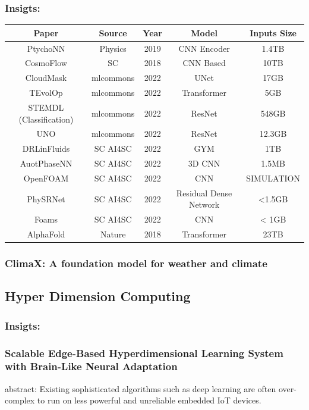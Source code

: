 \documentclass[UTF8]{article}
\begin{document}
\subsubsection{Insigts:}
\begin{tabular}{||c c c c c||} 
 \hline
 Paper & Source&Year& Model & Inputs Size \\ [0.5ex] 
 \hline\hline
 PtychoNN & Physics & 2019 & CNN Encoder &  1.4TB \\
 CosmoFlow & SC & 2018 & CNN Based & 10TB \\
 CloudMask & mlcommons & 2022 & UNet & 17GB \\
 TEvolOp & mlcommons & 2022 & Transformer & 5GB \\
 STEMDL (Classification) & mlcommons & 2022 & ResNet & 548GB \\
 UNO & mlcommons & 2022 & ResNet & 12.3GB \\
 DRLinFluids & SC AI4SC & 2022 & GYM & 1TB\\
 AuotPhaseNN & SC AI4SC & 2022 & 3D CNN & 1.5MB\\
 OpenFOAM & SC AI4SC & 2022 & CNN & SIMULATION\\
 PhySRNet& SC AI4SC & 2022 & Residual Dense Network & <1.5GB\\
 Foams & SC AI4SC & 2022 & CNN & < 1GB\\
 AlphaFold & Nature & 2018 & Transformer & 23TB \\
 \hline
\end{tabular}
\subsubsection{ClimaX: A foundation model for weather and climate}
\paragraph{}
\subsection{Hyper Dimension Computing}
\subsubsection{Insigts:}
\subsubsection{Scalable Edge-Based Hyperdimensional Learning System with Brain-Like Neural Adaptation}
abstract:
Existing sophisticated algorithms such as deep learning are often over-complex to run on less powerful and unreliable embedded IoT devices. 
\end{document}
